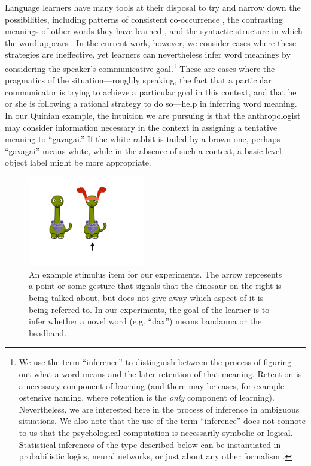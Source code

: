 \documentclass[review]{elsarticle}
\begin{document}
Language learners have many tools at their disposal to try and narrow down the possibilities, including patterns of consistent co-occurrence \citep{yu2007b}, the contrasting meanings of other words they have learned \citep{clark1988,markman1988}, and the syntactic structure in which the word appears \citep{gleitman1990}. In the current work, however, we consider cases where these strategies are ineffective, yet learners can nevertheless infer word meanings by considering the speaker's communicative goal.\footnote{We use the term ``inference'' to distinguish between the process of figuring out what a word means and the later retention of that meaning. Retention is a necessary component of learning (and there may be cases, for example ostensive naming, where retention is the \emph{only} component of learning). Nevertheless, we are interested here in the process of inference in ambiguous situations. We also note that the use of the term ``inference'' does not connote to us that the psychological computation is necessarily symbolic or logical. Statistical inferences of the type described below can be instantiated in probabilistic logics, neural networks, or just about any other formalism \citep{mackay2003}.} These are cases where the pragmatics of the situation---roughly speaking, the fact that a particular communicator is trying to achieve a particular goal in this context, and that he or she is following a rational strategy to do so---help in inferring word meaning.  In our Quinian example, the intuition we are pursuing is that the anthropologist may consider information necessary in the context in assigning a tentative meaning to ``gavagai.'' If the white rabbit is tailed by a brown one, perhaps ``gavagai'' means {\sc white}, while in the absence of such a context, a basic level object label might be more appropriate.

\begin{figure}[tr]
\begin{center}
\includegraphics[width=2in]{stims_simple.pdf}
\caption{\label{fig:stims} An example stimulus item for our experiments. The arrow represents a point or some gesture that signals that the dinosaur on the right is being talked about, but does not give away which aspect of it is being referred to. In our experiments, the goal of the learner is to infer whether a novel word (e.g. ``dax'') means {\sc bandanna} or the {\sc headband}.}
\end{center}
\end{figure}
\end{document}
